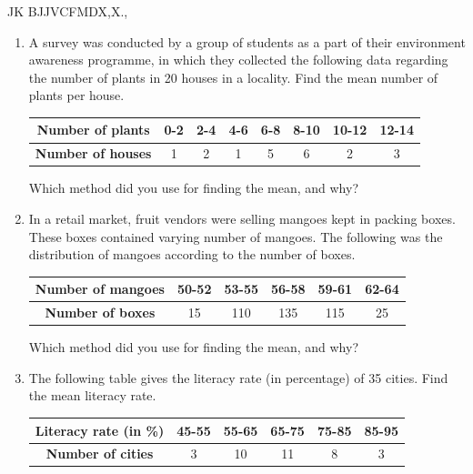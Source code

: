   JK BJJVCFMDX,X.,
\begin{enumerate}
\setlength\itemsep{1em}

\item A survey was conducted by a group of students as a part of their environment awareness
programme, in which they collected the following data regarding the number of plants in
20 houses in a locality. Find the mean number of plants per house.
\vspace{2mm}
\begin{center}
 \begin{tabular}{|c|c|c|c|c|c|c|c|}
  \hline
  \textbf{Number of plants} & 0-2 & 2-4 & 4-6 & 6-8 & 8-10 & 10-12 & 12-14\\
  \hline
  \textbf{Number of houses} & 1 & 2 & 1 & 5 & 6 & 2 & 3 \\
  \hline
 \end{tabular}
\end{center}
Which method did you use for finding the mean, and why?

\item In a retail market, fruit vendors were selling mangoes kept in packing boxes. These
boxes contained varying number of mangoes. The following was the distribution of
mangoes according to the number of boxes.

\vspace{2mm}
\begin{center}
 \begin{tabular}{|c|c|c|c|c|c|}
  \hline
  \textbf{Number of mangoes} & 50-52 & 53-55 & 56-58 & 59-61 & 62-64 \\
  \hline
  \textbf{Number of boxes} & 15 & 110 & 135 & 115 & 25 \\
  \hline
 \end{tabular}
\end{center}
Which method did you use for finding the mean, and why?

\item The following table gives the literacy rate (in percentage) of 35 cities. Find the mean
literacy rate.

\vspace{2mm}
\begin{center}
 \begin{tabular}{|c|c|c|c|c|c|}
  \hline
  \textbf{Literacy rate (in \%)} & 45-55 & 55-65 & 65-75 & 75-85 & 85-95 \\
  \hline
  \textbf{Number of cities} & 3 & 10 & 11 & 8 & 3 \\
  \hline
 \end{tabular}
\end{center}


\end{enumerate}
